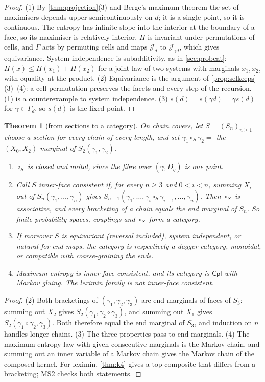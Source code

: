 \documentclass[11pt]{article}
\newtheorem{theorem}{Theorem}\newtheorem{proposition}[theorem]{Proposition}\newtheorem{lemma}[theorem]{Lemma}\newtheorem{corollary}[theorem]{Corollary}\newtheorem{conjecture}[theorem]{Conjecture}\crefname{conjecture}{Conjecture}{Conjectures}
\theoremstyle{definition}\newtheorem{definition}[theorem]{Definition}\newtheorem{remark}[theorem]{Remark}\newtheorem{example}[theorem]{Example}\newtheorem{problem}[theorem]{Open problem}\crefname{problem}{Problem}{Problems}
\begin{document}
\begin{proof}
(1) By \cref{thm:projection}(3) and Berge's maximum theorem the set of maximisers depends upper-semicontinuously on $d$; it is a single point, so it is continuous. The entropy has infinite slope into the interior at the boundary of a face, so its maximiser is relatively interior. $H$ is invariant under permutations of cells, and $\Gamma$ acts by permuting cells and maps $\mathcal J_d$ to $\mathcal J_{\gamma d}$, which gives equivariance. System independence is subadditivity, as in \cref{sec:probcat}: $H(x)\le H(x_1)+H(x_2)$ for a joint law of two systems with marginals $x_1,x_2$, with equality at the product. (2) Equivariance is the argument of \cref{prop:selkeeps}(3)--(4): a cell permutation preserves the facets and every step of the recursion. (1) is a counterexample to system independence. (3) $s(d)=s(\gamma d)=\gamma s(d)$ for $\gamma\in\Gamma_d$, so $s(d)$ is the fixed point.
\end{proof}

\begin{theorem}[from sections to a category]\label{thm:sec2cat}
On chain covers, let $S=(S_n)_{n\ge1}$ choose a section for every chain of every length, and set $\gamma_1\circ_S\gamma_2=$ the $(X_0,X_2)$ marginal of $S_2(\gamma_1,\gamma_2)$.
\begin{enumerate}
\item[(1)] $\circ_S$ is closed and unital, since the fibre over $(\gamma,D_q)$ is one point.
\item[(2)] Call $S$ \emph{inner-face consistent} if, for every $n\ge3$ and $0<i<n$, summing $X_i$ out of $S_n(\gamma_1,\dots,\gamma_n)$ gives $S_{n-1}(\gamma_1,\dots,\gamma_i\circ_S\gamma_{i+1},\dots,\gamma_n)$. Then $\circ_S$ is associative, and every bracketing of a chain equals the end marginal of $S_n$. So finite probability spaces, couplings and $\circ_S$ form a category.
\item[(3)] If moreover $S$ is equivariant (reversal included), system independent, or natural for end maps, the category is respectively a dagger category, monoidal, or compatible with coarse-graining the ends.
\item[(4)] Maximum entropy is inner-face consistent, and its category is $\mathsf{Cpl}$ with Markov gluing. The leximin family is not inner-face consistent.
\end{enumerate}
\end{theorem}

\begin{proof}
(2) Both bracketings of $(\gamma_1,\gamma_2,\gamma_3)$ are end marginals of faces of $S_3$: summing out $X_2$ gives $S_2(\gamma_1,\gamma_2\circ\gamma_3)$, and summing out $X_1$ gives $S_2(\gamma_1\circ\gamma_2,\gamma_3)$. Both therefore equal the end marginal of $S_3$, and induction on $n$ handles longer chains. (3) The three properties pass to end marginals. (4) The maximum-entropy law with given consecutive marginals is the Markov chain, and summing out an inner variable of a Markov chain gives the Markov chain of the composed kernel. For leximin, \cref{thm:k4} gives a top composite that differs from a bracketing; MS2 checks both statements.
\end{proof}
\end{document}
